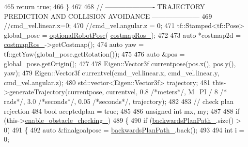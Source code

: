 \begin{DoxyCode}
{465                 \textcolor{keywordflow}{return} \textcolor{keyword}{true};
466             \}
467 
468             \textcolor{comment}{// ---------------------- TRAJECTORY PREDICTION AND COLLISION AVOIDANCE ---------------------}
469             \textcolor{comment}{//cmd\_vel.linear.x=0;}
470             \textcolor{comment}{//cmd\_vel.angular.z = 0;}
471             tf::Stamped<tf::Pose> global\_pose = \hyperlink{namespacecl__move__base__z_1_1backward__local__planner_afd5bb2a0d144f7b89f4215fbcb1fbe69}{optionalRobotPose}(
      \hyperlink{classcl__move__base__z_1_1backward__local__planner_1_1BackwardLocalPlanner_a4136268882a105d9e06e173d85d5c0dc}{costmapRos\_});
472 
473             \textcolor{keyword}{auto} *costmap2d = \hyperlink{classcl__move__base__z_1_1backward__local__planner_1_1BackwardLocalPlanner_a4136268882a105d9e06e173d85d5c0dc}{costmapRos\_}->getCostmap();
474             \textcolor{keyword}{auto} yaw = tf::getYaw(global\_pose.getRotation());
475 
476             \textcolor{keyword}{auto} &pos = global\_pose.getOrigin();
477 
478             Eigen::Vector3f currentpose(pos.x(), pos.y(), yaw);
479             Eigen::Vector3f currentvel(cmd\_vel.linear.x, cmd\_vel.linear.y, cmd\_vel.angular.z);
480             std::vector<Eigen::Vector3f> trajectory;
481             this->\hyperlink{classcl__move__base__z_1_1backward__local__planner_1_1BackwardLocalPlanner_a9e8921ca8ce379ca8ba321f82ca23cdc}{generateTrajectory}(currentpose, currentvel, 0.8 \textcolor{comment}{/*meters*/}, M\_PI / 8 \textcolor{comment}{/*
      rads*/}, 3.0 \textcolor{comment}{/*seconds*/}, 0.05 \textcolor{comment}{/*seconds*/}, trajectory);
482 
483             \textcolor{comment}{// check plan rejection}
484             \textcolor{keywordtype}{bool} aceptedplan = \textcolor{keyword}{true};
485 
486             \textcolor{keywordtype}{unsigned} \textcolor{keywordtype}{int} mx, my;
487 
488             \textcolor{keywordflow}{if} (this->\hyperlink{classcl__move__base__z_1_1backward__local__planner_1_1BackwardLocalPlanner_a154043366660cc02ec758dda32817511}{enable\_obstacle\_checking\_})
489             \{
490                 \textcolor{keywordflow}{if} (\hyperlink{classcl__move__base__z_1_1backward__local__planner_1_1BackwardLocalPlanner_ad9cde5c85f782cab2ddb4030e3c3f2cf}{backwardsPlanPath\_}.size() > 0)
491                 \{
492                     \textcolor{keyword}{auto} &finalgoalpose = \hyperlink{classcl__move__base__z_1_1backward__local__planner_1_1BackwardLocalPlanner_ad9cde5c85f782cab2ddb4030e3c3f2cf}{backwardsPlanPath\_}.back();
493 
494                     \textcolor{keywordtype}{int} i = 0;
}
\end{DoxyCode}
